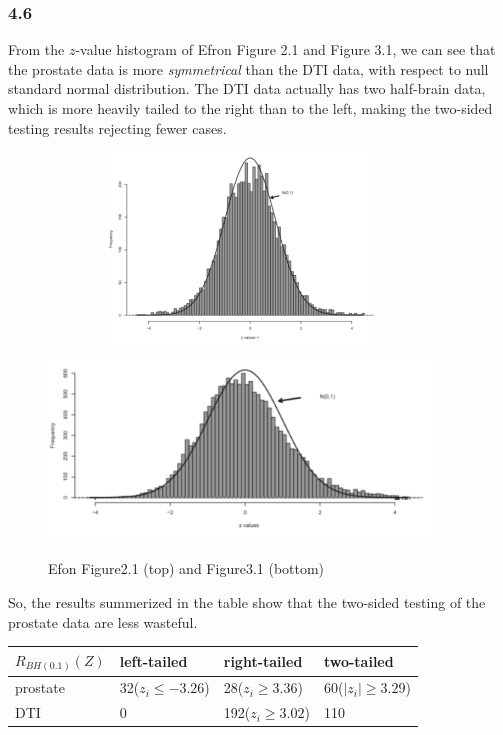 \documentclass{article}\usepackage{graphicx, color}
\begin{document}
\subsubsection*{4.6}
From the $z$-value histogram of Efron Figure 2.1 and Figure 3.1, we
can see that the prostate data is more \textit{symmetrical} than the
DTI data, with respect to null standard normal distribution. The DTI
data actually has two half-brain data, which is more heavily tailed to
the right than to the left, making the two-sided testing results
rejecting fewer cases.
\begin{figure}
\begin{center}
\includegraphics[height=2in,width=4in]{Fig21}
\includegraphics[height=2in,width=4in]{Fig31}
\caption{Efon Figure2.1 (top) and Figure3.1 (bottom)}
\end{center}
\end{figure}
So, the results summerized in the table show that the two-sided testing of the
prostate data are less wasteful. 
\begin{center}
\begin{tabular}{l|lll} \hline
$R_{BH(0.1)}(Z)$ & left-tailed & right-tailed & two-tailed  \\ \hline
prostate & 32($z_i\leq -3.26$) & 28($z_i\geq 3.36$) & 60($|z_i|\geq 3.29$) \\
DTI        & 0                              & 192($z_i\geq 3.02$) & 110
\end{tabular}
\end{center}
\end{document}
